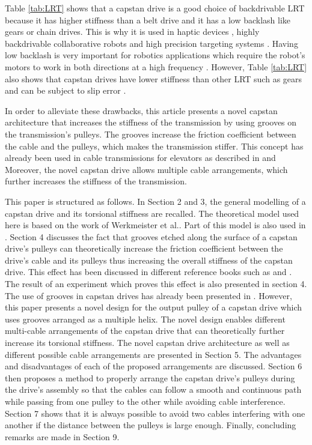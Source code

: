 \documentclass[10pt,cleanfoot]{asme2ej}
\begin{document}
\par Table \ref{tab:LRT} shows that a capstan drive is a good choice of backdrivable LRT because it has higher stiffness than a belt drive and it has a low backlash like gears or chain drives. This is why it is used in haptic devices \cite{perret2014advantages}\cite{baser2013kinematic}, highly backdrivable collaborative robots \cite{townsend1988effect}\cite{rooks2006harmonious}\cite{phan2014guided} and high precision targeting systems \cite{lu2015development}\cite{lu2012non}\cite{lu2013transmission}\cite{xie2019analytical}. Having low backlash is very important for  robotics applications which require the robot's motors to work in both directions at a high frequency \cite{brooks1990telerobotic}\cite{gealy2019quasi}. However, Table \ref{tab:LRT} also shows that capstan drives have lower stiffness than other LRT such as gears and can be subject to slip error \cite{lu2013transmission}\cite{baser2010theoretical}.\par
In order to alleviate these drawbacks, this article presents a novel capstan architecture that increases the stiffness of the transmission by using grooves on the transmission's pulleys. The grooves increase the friction coefficient between the cable and the pulleys, which makes the transmission stiffer. This concept has already been used in cable transmissions for elevators as described in \cite{elevator_german} and \cite{elevator} Moreover, the novel capstan drive allows multiple cable arrangements, which further increases the stiffness of the transmission.\par This paper is structured as follows. In Section 2 and 3, the general modelling of a capstan drive and its torsional stiffness are recalled. The theoretical model used here is based on the work of Werkmeister et al.\cite{werkmeister2007theoretical}. Part of this model is also used in \cite{baser2010theoretical}. Section 4 discusses the fact that grooves etched along the surface of a capstan drive's pulleys can theoretically increase the friction coefficient between the drive's cable and its pulleys thus increasing the overall stiffness of the capstan drive. This effect has been discussed in different reference books such as \cite{elevator_german} and \cite{elevator}. The result of an experiment which proves this effect is also presented in  section 4. The use of grooves in capstan drives has already been presented in \cite{lu2012non}. However, this paper presents a novel design for the output pulley of a capstan drive which uses grooves arranged as a multiple helix. The novel design enables different multi-cable arrangements of the capstan drive that can theoretically further increase its torsional stiffness. The novel capstan drive architecture as well as different possible cable arrangements are presented in Section 5. The advantages and disadvantages  of each of the proposed arrangements are discussed. Section 6 then proposes a method to properly arrange the capstan drive's pulleys during the drive's assembly so that the cables can follow a smooth and continuous path while passing from one pulley to the other while avoiding cable interference. Section 7 shows that it is always possible to avoid two cables interfering with one another if the distance between the pulleys is large enough. Finally, concluding remarks are made in Section 9.
\end{document}
